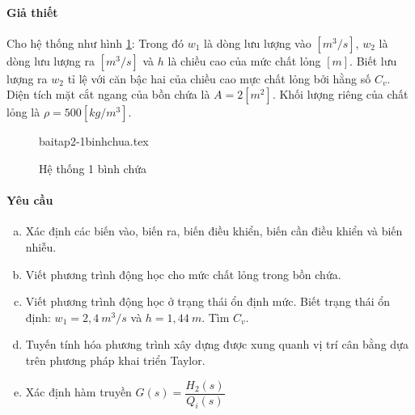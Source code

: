 \paragraph{Giả thiết}
    Cho hệ thống như hình \ref{baitap2-1binhchua}: Trong đó $w_1$ là dòng lưu lượng vào $[m^3/s]$, $w_2$ là dòng lưu lượng ra $[m^3/s]$ và $h$ là chiều cao của mức chất lỏng $[m]$. Biết lưu lượng ra $w_2$ tỉ lệ với căn bậc hai của chiều cao mực chất lỏng bởi hằng số $C_v$. Diện tích mặt cắt ngang của bồn chứa là $A = 2[m^2]$. Khối lượng riêng của chất lỏng là $\rho = 500[kg/m^3]$.
    \begin{figure}[htp]
        \begin{center}
            {baitap2-1binhchua.tex}
        \end{center}
        \caption{Hệ thống 1 bình chứa} \label{baitap2-1binhchua}
    \end{figure}

\paragraph{Yêu cầu}
    \begin{enumerate}[a.]
        \item Xác định các biến vào, biến ra, biến điều khiển, biến cần điều khiển và biến nhiễu.
        \item Viết phương trình động học cho mức chất lỏng trong bồn chứa.
        \item Viết phương trình động học ở trạng thái ổn định mức. Biết trạng thái ổn định: $w_1 = 2,4~m^3/s$ và $h = 1,44~m$. Tìm $C_v$.
        \item Tuyến tính hóa phương trình xây dựng được xung quanh vị trí cân bằng dựa trên phương pháp khai triển Taylor.
        \item Xác định hàm truyền $G(s) = \dfrac{H_2(s)}{Q_i(s)}$
    \end{enumerate}

